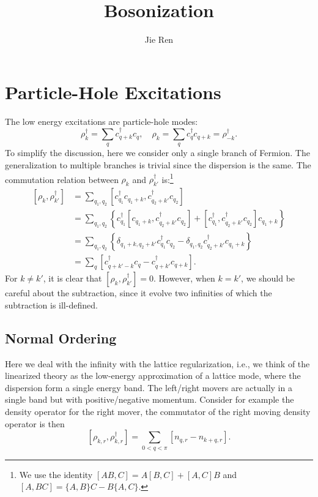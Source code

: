 \documentclass[aps,prb,superscriptaddress,nofootinbib]{revtex4}
\begin{document}
\title{Bosonization}
\author{Jie Ren}


\maketitle


\tableofcontents

\section{Particle-Hole Excitations}

The low energy excitations are particle-hole modes:
\begin{equation}
	\rho_{k}^\dagger = \sum_{q} c_{q+k}^\dagger c_{q}, \quad
	\rho_{k} = \sum_{q} c_{q}^\dagger c_{q+k} = \rho_{-k}^\dagger.
\end{equation}
To simplify the discussion, here we consider only a single branch of Fermion. 
The generalization to multiple branches is trivial since the dispersion is the same.
The commutation relation between $\rho_k$ and $\rho_{k'}^\dagger$ is:\footnote{We use the identity $[AB,C] = A[B,C] + [A,C]B$ and $[A,BC]=\{A,B\}C - B\{A,C\}$.}
\begin{equation}
\begin{aligned}
	\left[\rho_{k}, \rho_{k'}^\dagger \right]
	&= \sum_{q_1, q_2} \left[c_{q_1}^\dagger c_{q_1+k}, c_{q_2+k'}^\dagger c_{q_2}\right] \\
	&= \sum_{q_1, q_2} \left\{c_{q_1}^\dagger \left[c_{q_1+k}, c_{q_2+k'}^\dagger c_{q_2}\right] +\left[c_{q_1}^\dagger, c_{q_2+k'}^\dagger c_{q_2}\right] c_{q_1+k}\right\} \\
	&= \sum_{q_1, q_2} \left\{ \delta_{q_1+k,q_2+k'} c_{q_1}^\dagger c_{q_2} -
		\delta_{q_1,q_2} c_{q_2+k'}^\dagger c_{q_1+k} \right\} \\
	&= \sum_{q}\left[c^\dagger_{q+k'-k} c_{q}-c^\dagger_{q+k'} c_{q+k}\right].
\end{aligned}
\end{equation}
For $k \ne k'$, it is clear that $[\rho_{k},\rho_{k'}^\dagger]=0$.
However, when $k = k'$, we should be careful about the subtraction, since it evolve two infinities of which the subtraction is ill-defined.


\subsection{Normal Ordering}
Here we deal with the infinity with the lattice regularization, i.e., we think of the linearized theory as the low-energy approximation of a lattice mode, where the dispersion form a single energy band.
The left/right movers are actually in a single band but with positive/negative momentum.
Consider for example the density operator for the right mover, the commutator of the right moving density operator is then
\begin{equation}
	\left[\rho_{k,r}, \rho_{k,r}^\dagger \right] = \sum_{0<q<\pi} [n_{q,r}-n_{k+q,r}].
\end{equation}
\end{document}
